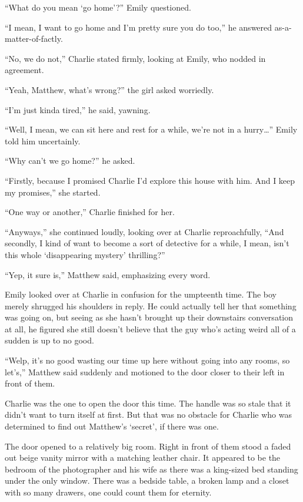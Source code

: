 “What do you mean ‘go home’?” Emily questioned.

“I mean, I want to go home and I’m pretty sure you do too,” he answered as-a-matter-of-factly.

“No, we do not,” Charlie stated firmly, looking at Emily, who nodded in agreement.

“Yeah, Matthew, what’s wrong?” the girl asked worriedly.

“I’m just kinda tired,” he said, yawning.

“Well, I mean, we can sit here and rest for a while, we’re not in a hurry…” Emily told him uncertainly.

“Why can’t we go home?” he asked.

“Firstly, because I promised Charlie I’d explore this house with him. And I keep my promises,” she started.

“One way or another,” Charlie finished for her.

“Anyways,” she continued loudly, looking over at Charlie reproachfully, “And secondly, I kind of want to become a sort of detective for a while, I mean, isn’t this whole ‘disappearing mystery’ thrilling?”

“Yep, it sure is,” Matthew said, emphasizing every word.

Emily looked over at Charlie in confusion for the umpteenth time. The boy merely shrugged his shoulders in reply. He could actually tell her that something was going on, but seeing as she hasn’t brought up their downstairs conversation at all, he figured she still doesn’t believe that the guy who’s acting weird all of a sudden is up to no good.

“Welp, it’s no good wasting our time up here without going into any rooms, so let’s,” Matthew said suddenly and motioned to the door closer to their left in front of them.

Charlie was the one to open the door this time. The handle was so stale that it didn’t want to turn itself at first. But that was no obstacle for Charlie who was determined to find out Matthew’s ‘secret’, if there was one.

The door opened to a relatively big room. Right in front of them stood a faded out beige vanity mirror with a matching leather chair. It appeared to be the bedroom of the photographer and his wife as there was a king-sized bed standing under the only window. There was a bedside table, a broken lamp and a closet with so many drawers, one could count them for eternity.

